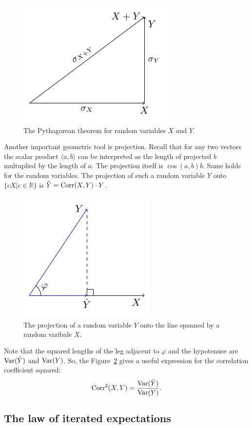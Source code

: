 \begin{figure}[h!]
\begin{center}
\includegraphics[width=0.4\linewidth]{figures/01_pythagorean_theorem.pdf}
\caption{The Pythagorean theorem for random variables $X$ and $Y$.}
\label{fig:rv_pyth}
\end{center}
\end{figure}

Another important geometric tool is projection.
Recall that for any two vectors the scalar product $\langle a, b \rangle$
can be interpreted as the length of projected $b$ multuplied by the length of $a$.
The projection itself is $\cos(a, b) b$.
Same holds for the random variables.
The projection of such a random variable $Y$ onto $\{cX| c \in \mathbb{R}\}$ is
$\hat Y = \operatorname{Corr}(X,Y) \cdot Y$.

\begin{figure}[h!]
\begin{center}
\includegraphics[width=0.4\linewidth]{figures/01_basic_projection.pdf}
\caption{The projection of a random variable $Y$ onto the line spanned by
a random varibale $X$.}
\label{fig:rv_proj}
\end{center}
\end{figure}

Note that the squared lengths of the leg adjacent to $\varphi$ and the
hypotenuse are $\operatorname{Var}(\hat Y)$ and $\operatorname{Var}(Y)$.
So, the Figure~\ref{fig:rv_proj} gives a useful expression for the correlation
coefficient squared:
\[
\operatorname{Corr}^2(X,Y) = \frac{\operatorname{Var}(\hat Y)}{\operatorname{Var}(Y)}.
\]

\subsection{The law of iterated expectations}

